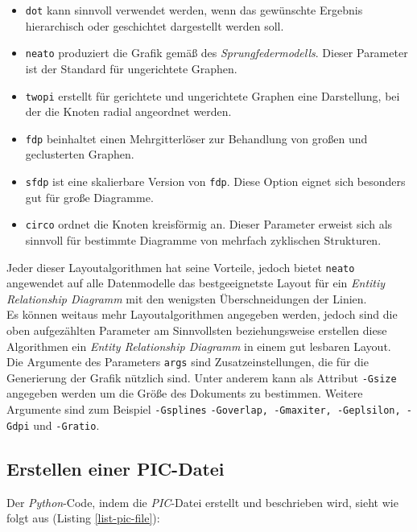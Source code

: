 \begin{itemize} \pra 
	\item{\verb|dot|} kann sinnvoll verwendet werden, wenn das gewünschte Ergebnis hierarchisch oder geschichtet dargestellt werden soll.
	\item{\verb|neato|} produziert die Grafik gemäß des \textit{Sprungfedermodells}. Dieser Parameter ist der Standard für ungerichtete Graphen.
	\item{\verb|twopi|} erstellt für gerichtete und ungerichtete Graphen eine Darstellung, bei der die Knoten radial angeordnet werden.
	\item{\verb|fdp|} beinhaltet einen Mehrgitterlöser zur Behandlung von großen und geclusterten Graphen.
	\item{\verb|sfdp|} ist eine skalierbare Version von \verb|fdp|. Diese Option eignet sich besonders gut für große Diagramme.
	\item{\verb|circo|} ordnet die Knoten kreisförmig an. Dieser Parameter erweist sich als sinnvoll für bestimmte Diagramme von mehrfach zyklischen Strukturen.
\end{itemize}

\noindent
Jeder dieser Layoutalgorithmen hat seine Vorteile, jedoch bietet \verb|neato| angewendet auf alle Datenmodelle das bestgeeignetste Layout für ein \textit{Entitiy Relationship Diagramm} mit den wenigsten Überschneidungen der Linien.
\\

\noindent
Es können weitaus mehr Layoutalgorithmen angegeben werden, jedoch sind die oben aufgezählten Parameter am Sinnvollsten beziehungsweise erstellen diese Algorithmen ein \textit{Entity Relationship Diagramm} in einem gut lesbaren Layout. 
\\

\noindent
Die Argumente des Parameters \verb|args| sind Zusatzeinstellungen, die für die Generierung der Grafik nützlich sind. Unter anderem kann als Attribut \verb|-Gsize| angegeben werden um die Größe des Dokuments zu bestimmen. Weitere Argumente sind zum Beispiel \verb|-Gsplines|
\verb|-Goverlap, -Gmaxiter, -Geplsilon, -Gdpi| und \verb|-Gratio|.
\\

\subsection{Erstellen einer PIC-Datei}
\pra

\noindent
Der \textit{Python}-Code, indem die \textit{PIC}-Datei erstellt und beschrieben wird, sieht wie folgt aus (Listing \ref{list-pic-file}):

